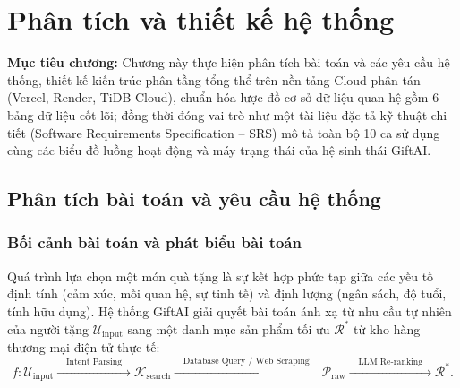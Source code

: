 
\chapter{Phân tích và thiết kế hệ thống}
\label{ch:thietke}

\begin{infobox}
\textbf{Mục tiêu chương:} 
Chương này thực hiện phân tích bài toán và các yêu cầu hệ thống, thiết kế kiến trúc phân tầng tổng thể trên nền tảng Cloud phân tán (Vercel, Render, TiDB Cloud), chuẩn hóa lược đồ cơ sở dữ liệu quan hệ gồm 6 bảng dữ liệu cốt lõi; đồng thời đóng vai trò như một tài liệu đặc tả kỹ thuật chi tiết (Software Requirements Specification -- SRS) mô tả toàn bộ 10 ca sử dụng cùng các biểu đồ luồng hoạt động và máy trạng thái của hệ sinh thái GiftAI.
\end{infobox}


\section{Phân tích bài toán và yêu cầu hệ thống}

\subsection{Bối cảnh bài toán và phát biểu bài toán}
Quá trình lựa chọn một món quà tặng là sự kết hợp phức tạp giữa các yếu tố định tính (cảm xúc, mối quan hệ, sự tinh tế) và định lượng (ngân sách, độ tuổi, tính hữu dụng). Hệ thống GiftAI giải quyết bài toán ánh xạ từ nhu cầu tự nhiên của người tặng $\mathcal{U}_{\mathrm{input}}$ sang một danh mục sản phẩm tối ưu $\mathcal{R}^*$ từ kho hàng thương mại điện tử thực tế:
\begin{equation}
f: \mathcal{U}_{\mathrm{input}} \xrightarrow{\quad \text{Intent Parsing} \quad} \mathcal{K}_{\mathrm{search}} \xrightarrow{\quad \text{Database Query / Web Scraping} \quad} \mathcal{P}_{\mathrm{raw}} \xrightarrow{\quad \text{LLM Re-ranking} \quad} \mathcal{R}^*.
\end{equation}


